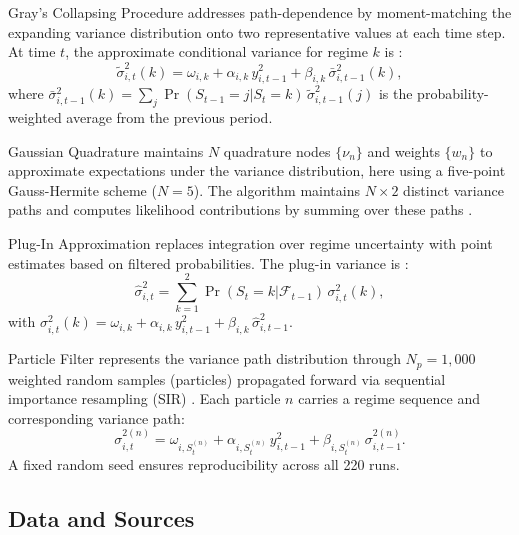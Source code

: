 \documentclass[12pt, a4paper]{article}
\begin{document}
Gray's Collapsing Procedure addresses path-dependence by moment-matching the expanding variance distribution onto two representative values at each time step. At time $t$, the approximate conditional variance for regime $k$ is \citep{Gray1996}:
\begin{equation}
\tilde{\sigma}_{i,t}^2(k) = \omega_{i,k} + \alpha_{i,k}\,y_{i,t-1}^2 + \beta_{i,k}\,\bar{\sigma}_{i,t-1}^2(k),
\end{equation}
where $\bar{\sigma}_{i,t-1}^2(k) = \sum_j \Pr(S_{t-1}=j|S_t=k)\,\tilde{\sigma}_{i,t-1}^2(j)$ is the probability-weighted average from the previous period.

Gaussian Quadrature maintains $N$ quadrature nodes $\{\nu_n\}$ and weights $\{w_n\}$ to approximate expectations under the variance distribution, here using a five-point Gauss-Hermite scheme ($N=5$). The algorithm maintains $N \times 2$ distinct variance paths and computes likelihood contributions by summing over these paths \citep{Tanizaki1996, Monfort2015}.

Plug-In Approximation replaces integration over regime uncertainty with point estimates based on filtered probabilities. The plug-in variance is \citep{Klaassen2002}:
\begin{equation}
\hat{\sigma}_{i,t}^2 = \sum_{k=1}^{2}\Pr(S_t=k|\mathcal{F}_{t-1})\,\sigma_{i,t}^2(k),
\end{equation}
with $\sigma_{i,t}^2(k) = \omega_{i,k} + \alpha_{i,k}\,y_{i,t-1}^2 + \beta_{i,k}\,\hat{\sigma}_{i,t-1}^2$.

Particle Filter represents the variance path distribution through $N_p = 1{,}000$ weighted random samples (particles) propagated forward via sequential importance resampling (SIR) \citep{Doucet2009, Pitt1999}. Each particle $n$ carries a regime sequence and corresponding variance path:
\begin{equation}
\sigma_{i,t}^{2(n)} = \omega_{i,S_t^{(n)}} + \alpha_{i,S_t^{(n)}}\,y_{i,t-1}^2 + \beta_{i,S_t^{(n)}}\,\sigma_{i,t-1}^{2(n)}.
\end{equation}
A fixed random seed ensures reproducibility across all 220 runs.

\subsection{Data and Sources}
\end{document}

